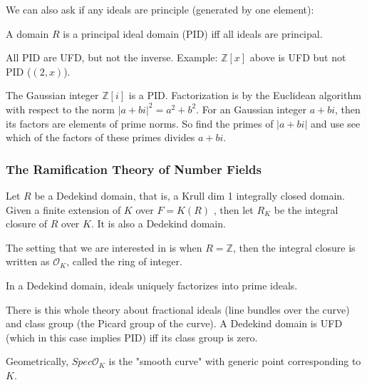 \documentclass[main.tex]{subfiles}
\begin{document}
We can also ask if any ideals are principle (generated by one element):

\begin{definition}
A domain $R$ is a principal ideal domain (PID) iff all ideals are principal.
\end{definition}

\begin{remark}
All PID are UFD, but not the inverse. Example: $\mathbb{Z}[x]$ above is UFD but not PID ($(2, x)$).
\end{remark}

\begin{example}
The Gaussian integer $\mathbb{Z}[i]$ is a PID. Factorization is by the Euclidean algorithm with respect to the norm $|a + bi|^2 = a^2 + b^2$. For an Gaussian integer $a + bi$, then its factors are elements of prime norms. So find the primes of $|a + bi|$ and use see which of the factors of these primes divides $a + bi$.
\end{example}


\subsubsection{The Ramification Theory of Number Fields}

Let $R$ be a Dedekind domain, that is, a Krull dim 1 integrally closed domain. Given a finite extension of $K$ over $F = K(R)$ , then let $R_K$ be the integral closure of $R$ over $K$. It is also a Dedekind domain.

\begin{remark}
The setting that we are interested in is when $R = \mathbb{Z}$, then the integral closure is written as $\mathcal{O}_K$, called the ring of integer.
\end{remark}

\begin{lemma}
In a Dedekind domain, ideals uniquely factorizes into prime ideals.
\end{lemma}

\begin{remark}
There is this whole theory about fractional ideals (line bundles over the curve) and class group (the Picard group of the curve). A Dedekind domain is UFD (which in this case implies PID) iff its class group is zero.
\end{remark}

Geometrically, $Spec \mathcal{O}_K$ is the "smooth curve" with generic point corresponding to $K$.
\end{document}
